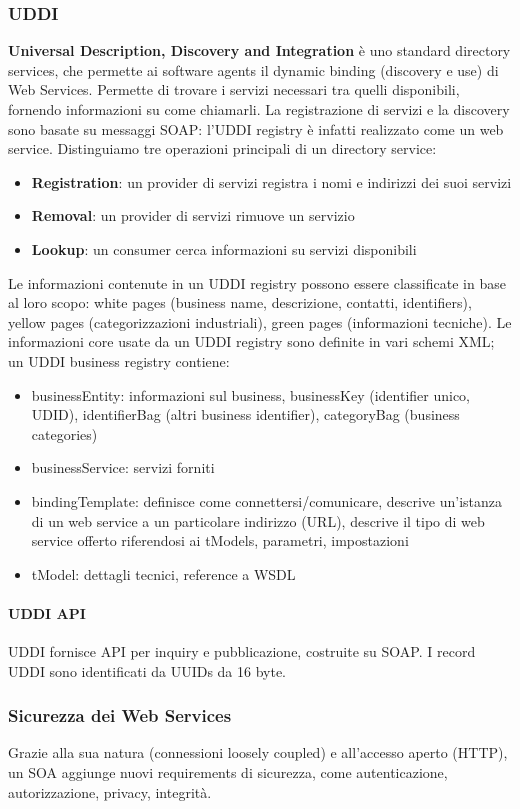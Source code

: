 \documentclass[11pt]{article}
\begin{document}
\subsubsection{UDDI}
\textbf{Universal Description, Discovery and Integration} è uno standard directory services, che permette ai software agents il dynamic binding (discovery e use) di Web Services. Permette di trovare i servizi necessari tra quelli disponibili, fornendo informazioni su come chiamarli. La registrazione di servizi e la discovery sono basate su messaggi SOAP: l'UDDI registry è infatti realizzato come un web service.  
Distinguiamo tre operazioni principali di un directory service:
\begin{itemize}
    \item \textbf{Registration}: un provider di servizi registra i nomi e indirizzi dei suoi servizi 
    \item \textbf{Removal}: un provider di servizi rimuove un servizio
    \item \textbf{Lookup}: un consumer cerca informazioni su servizi disponibili
\end{itemize}
Le informazioni contenute in un UDDI registry possono essere classificate in base al loro scopo: white pages (business name, descrizione, contatti, identifiers), yellow pages (categorizzazioni industriali), green pages (informazioni tecniche). 
Le informazioni core usate da un UDDI registry sono definite in vari schemi XML; un UDDI business registry contiene:
\begin{itemize}
    \item businessEntity: informazioni sul business, businessKey (identifier unico, UDID), identifierBag (altri business identifier), categoryBag (business categories)
    \item businessService: servizi forniti
    \item bindingTemplate: definisce come connettersi/comunicare, descrive un'istanza di un web service a un particolare indirizzo (URL), descrive il tipo di web service offerto riferendosi ai tModels, parametri, impostazioni
    \item tModel: dettagli tecnici, reference a WSDL
\end{itemize}
\paragraph{UDDI API} UDDI fornisce API per inquiry e pubblicazione, costruite su SOAP. I record UDDI sono identificati da UUIDs da 16 byte. 
\subsubsection{Sicurezza dei Web Services}
Grazie alla sua natura (connessioni loosely coupled) e all'accesso aperto (HTTP), un SOA aggiunge nuovi requirements di sicurezza, come autenticazione, autorizzazione, privacy, integrità.
\end{document}
